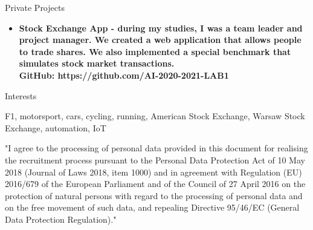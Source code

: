 \documentclass{resume}
\begin{document}
\begin{rSection}{Private Projects}

    \begin{itemize}
        \item \bf Stock Exchange App \normalfont - during my studies, I was a team leader and project manager.
              We created a web application that allows people to trade shares. We also implemented a special benchmark that simulates stock market transactions.\\
              GitHub: https://github.com/AI-2020-2021-LAB1
    \end{itemize}

\end{rSection}

\begin{rSection}{Interests}

    {F1, motorsport, cars, cycling, running, American Stock Exchange, Warsaw Stock Exchange, automation, IoT}

\end{rSection}

{\footnotesize "I agree to the processing of personal data provided in this document for realising the recruitment process pursuant to the Personal Data
Protection Act of 10 May 2018 (Journal of Laws 2018, item 1000) and in agreement with Regulation (EU) 2016/679 of the European Parliament and of
the Council of 27 April 2016 on the protection of natural persons with regard to the processing of personal data and on the free movement of such
data, and repealing Directive 95/46/EC (General Data Protection Regulation)."}
\end{document}
